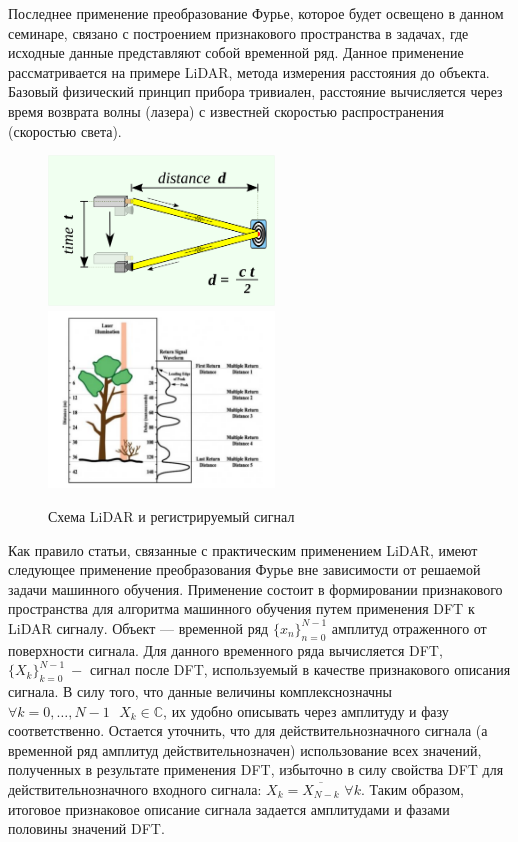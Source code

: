 Последнее применение преобразование Фурье, которое будет освещено в данном семинаре, связано с построением признакового пространства в задачах, где исходные данные представляют собой временной ряд. Данное применение рассматривается на примере LiDAR, метода измерения расстояния до объекта. Базовый физический принцип прибора тривиален, расстояние вычисляется через время возврата волны (лазера) с известней скоростью распространения (скоростью света).
\begin{figure}[!tb]
\centering
\includegraphics[width=6cm]{chapters/grigorev_s1/pictures/lidar_scheme}%
\includegraphics[width=6cm]{chapters/grigorev_s1/pictures/lidar}%
\caption{Схема LiDAR и регистрируемый сигнал}
\end{figure}

Как правило статьи, связанные с практическим применением LiDAR, имеют следующее применение преобразования Фурье вне зависимости от решаемой задачи машинного обучения. Применение состоит в формировании признакового пространства для алгоритма машинного обучения путем применения DFT к LiDAR сигналу. Объект — временной ряд $\{x_n\}_{n=0}^{N-1}$ амплитуд отраженного от поверхности сигнала. Для данного временного ряда вычисляется DFT, $\{X_k\}_{k=0}^{N-1} ~- $ сигнал после DFT, используемый в качестве признакового описания сигнала. В силу того, что данные величины комплекснозначны $\forall k = 0, \dots, N-1 \,\,\,\, X_k \in \mathbb{C}$, их удобно описывать через амплитуду и фазу соответственно. Остается уточнить, что для действительнозначного сигнала (а временной ряд амплитуд действительнозначен) использование всех значений, полученных в результате применения DFT, избыточно в силу свойства DFT для действительнозначного входного сигнала: $X_k = \overline{X_{N-k}} \,\, \forall k$. Таким образом, итоговое признаковое описание сигнала задается амплитудами и фазами половины значений DFT.

